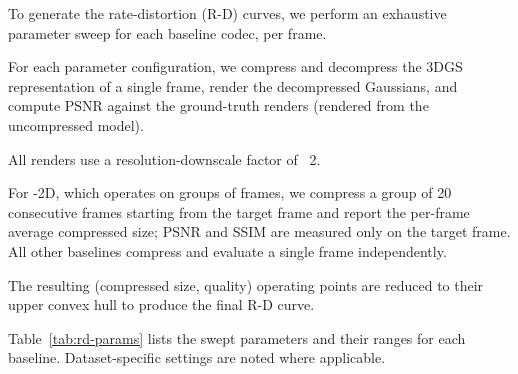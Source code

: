 
To generate the rate-distortion (R-D) curves, we perform an exhaustive parameter sweep for each baseline codec, per frame.

For each parameter configuration, we compress and decompress the 3DGS representation of a single frame, render the decompressed Gaussians, and compute PSNR against the ground-truth renders (rendered from the uncompressed model).

All renders use a resolution-downscale factor of ~2.

For \vthree{}-2D, which operates on groups of frames, we compress a group of 20 consecutive frames starting from the target frame and report the per-frame average compressed size; PSNR and SSIM are measured only on the target frame. 
%
All other baselines compress and evaluate a single frame independently.

The resulting (compressed size, quality) operating points are reduced to their upper convex hull to produce the final R-D curve.

Table~\ref{tab:rd-params} lists the swept parameters and their ranges for each baseline. Dataset-specific settings are noted where applicable.

